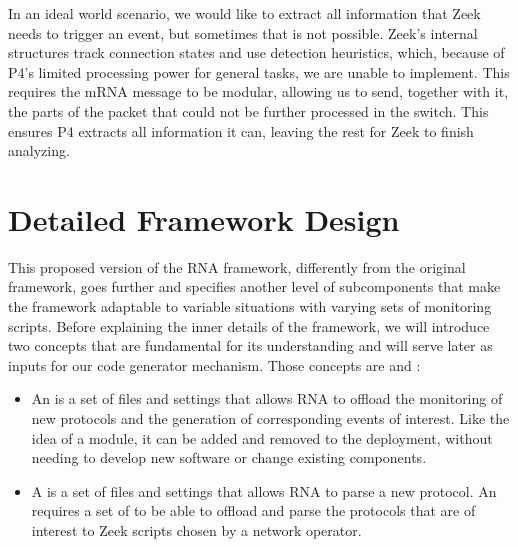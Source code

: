 In an ideal world scenario, we would like to extract all information that Zeek needs to trigger an event, but sometimes that is not possible. Zeek's internal structures track connection states and use detection heuristics, which, because of P4's limited processing power for general tasks, we are unable to implement. This requires the mRNA message to be modular, allowing us to send, together with it, the parts of the packet that could not be further processed in the switch. This ensures P4 extracts all information it can, leaving the rest for Zeek to finish analyzing.

% 
\section{Detailed Framework Design}
\label{sec:rna:detailed_design}

This proposed version of the RNA framework, differently from the original framework, goes further and specifies another level of subcomponents that make the framework adaptable to variable situations with varying sets of monitoring scripts. Before explaining the inner details of the framework, we will introduce two concepts that are fundamental for its understanding and will serve later as inputs for our code generator mechanism. Those concepts are \Offloader{} and \ProtocolTemplate{}:

\begin{itemize}
    \item An \textit{\Offloader{}} is a set of files and settings that allows RNA to offload the monitoring of new protocols and the generation of corresponding events of interest. Like the idea of a module, it can be added and removed to the deployment, without needing to develop new software or change existing components.

    \item A \textit{\ProtocolTemplate{}} is a set of files and settings that allows RNA to parse a new protocol. An \Offloader{} requires a set of \ProtocolTemplates{} to be able to offload and parse the protocols that are of interest to Zeek scripts chosen by a network operator.
\end{itemize}

